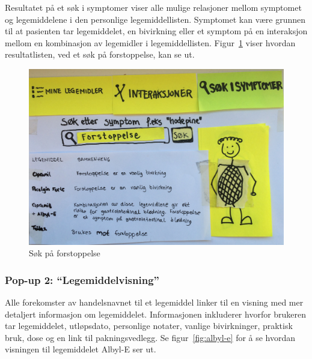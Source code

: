 Resultatet på et søk i symptomer viser alle mulige relasjoner mellom symptomet og legemiddelene i den personlige legemiddellisten. Symptomet kan være grunnen til at pasienten tar legemiddelet, en bivirkning eller et symptom på en interaksjon mellom en kombinasjon av legemidler i legemiddellisten. Figur~\ref{fig:sokEtterPP} viser hvordan resultatlisten, ved et søk på forstoppelse, kan se ut.

\begin{figure}[H]
    \centering
    \includegraphics[width=1\textwidth]{fig/utviklingAvPrototype/sokEtterPP.jpg}
    \caption{Søk på forstoppelse}
    \label{fig:sokEtterPP}
\end{figure} 

\subsubsection{Pop-up 2: “Legemiddelvisning”}
Alle forekomster av handelsnavnet til et legemiddel linker til en visning med mer detaljert informasjon om legemiddelet. Informasjonen inkluderer hvorfor brukeren tar legemiddelet, utløpsdato, personlige notater, vanlige bivirkninger, praktisk bruk, dose og en link til pakningsvedlegg. Se figur~\ref{fig:albyl-e} for å se hvordan visningen til legemiddelet Albyl-E ser ut.

